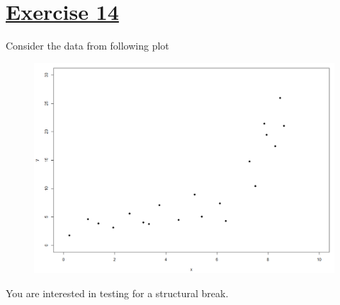 \documentclass[captions=tableheading, 12pt, headings=small, parskip=half]{scrartcl}
\begin{document}
\section*{\underline{Exercise 14}}
Consider the data from following plot
\begin{figure}[H]
	\centering
	\includegraphics[width = 0.7\columnwidth]{Code2/sbreak1.png}
\end{figure}
You are interested in testing for a structural break.
\end{document}
